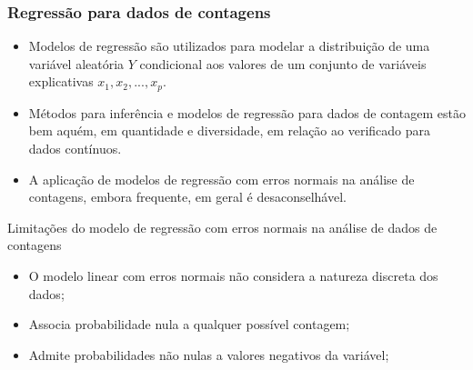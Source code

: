 \documentclass[10pt, aspectratio=169]{beamer}
\begin{document}


\begin{frame}\frametitle{Regressão para dados de contagens}

\begin{itemize}

\item Modelos de regressão são utilizados para modelar a distribuição de uma variável aleatória $Y$ condicional aos valores de um conjunto de variáveis explicativas $x_{1},x_{2},...,x_{p}$.

\vspace{0,5cm}

\item Métodos para inferência e modelos de regressão para dados de contagem estão bem
aquém, em quantidade e diversidade, em relação ao verificado para dados contínuos.

\vspace{0,5cm}

\item A aplicação de modelos de regressão com erros normais na análise de contagens, embora frequente, em geral é desaconselhável.

\end{itemize}
\end{frame}



\begin{frame}{Limitações do modelo de regressão com erros normais na análise de dados de contagens}
    
    \vspace{0,5cm}
    
    \begin{itemize}
        \item O modelo linear com erros normais não considera a natureza discreta dos dados;
        
        \vspace{0,5cm}
        
        \item Associa probabilidade nula a qualquer possível contagem;
        
        \vspace{0,5cm}
        
        \item Admite probabilidades não nulas a valores negativos da variável;
       
    \end{itemize}
    
\end{frame}
\end{document}
